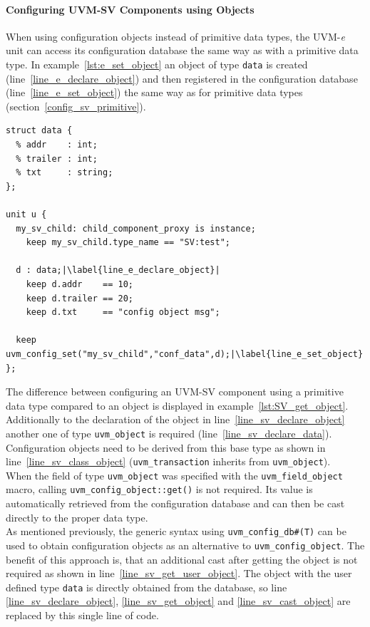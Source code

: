 \paragraph{Configuring UVM-SV Components using Objects}\label{e_config_sv_object}

When using configuration objects instead of primitive data types, the UVM-\textit{e} unit can access its configuration
database the same way as with a primitive data type. In example~\ref{lst:e_set_object} an object of type \lstinline$data$ is created (line~\ref{line_e_declare_object}) and then registered in the
configuration database (line~\ref{line_e_set_object}) the same way as for primitive data types
(section~\ref{config_sv_primitive}).

\lstset{language=e, numbers = left, escapechar=|, breaklines=true}
\begin{lstlisting}[frame=htrbl, caption={e: register an object in configuration database}, label={lst:e_set_object}]
struct data {
  % addr    : int;
  % trailer : int;
  % txt     : string;
};

unit u {
  my_sv_child: child_component_proxy is instance;
    keep my_sv_child.type_name == "SV:test";
  
  d : data;|\label{line_e_declare_object}|
    keep d.addr    == 10;
    keep d.trailer == 20;
    keep d.txt     == "config object msg";

  keep uvm_config_set("my_sv_child","conf_data",d);|\label{line_e_set_object}|
};
\end{lstlisting}
The difference between configuring an UVM-SV component using a primitive data type compared to an object
is displayed in example~\ref{lst:SV_get_object}. Additionally to the declaration of the object in
line~\ref{line_sv_declare_object} another one of type \lstinline$uvm_object$ is required
(line~\ref{line_sv_declare_data}). Configuration objects need to be derived from this base type as shown in
line~\ref{line_sv_class_object} (\lstinline$uvm_transaction$ inherits from \lstinline$uvm_object$).\\
When the field of type \lstinline$uvm_object$ was specified with the \lstinline$uvm_field_object$ macro, calling
\lstinline$uvm_config_object::get()$ is not required. Its value is automatically retrieved from the configuration
database and can then be cast directly to the proper data type.\\
As mentioned previously, the generic syntax using \lstinline$uvm_config_db#(T)$ can be used to obtain configuration
objects as an alternative to \lstinline$uvm_config_object$.
The benefit of this approach is, that an additional cast after getting the object is not required as shown in
line~\ref{line_sv_get_user_object}. The object with the user defined type \lstinline$data$ is directly obtained from
the database, so line \ref{line_sv_declare_object}, \ref{line_sv_get_object} and \ref{line_sv_cast_object} are replaced
by this single line of code.

